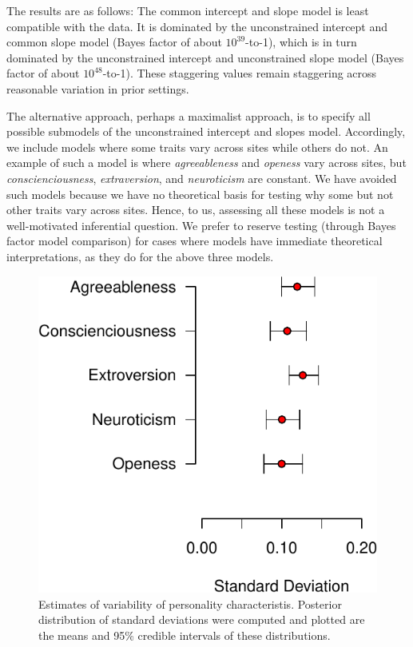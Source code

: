 \documentclass[english,man]{apa6}
\theoremstyle{definition}
\theoremstyle{definition}
\theoremstyle{remark}
\begin{document}
The results are as follows: The common intercept and slope model is
least compatible with the data. It is dominated by the unconstrained
intercept and common slope model (Bayes factor of about
\(10^{39}\)-to-1), which is in turn dominated by the unconstrained
intercept and unconstrained slope model (Bayes factor of about
\(10^{48}\)-to-1). These staggering values remain staggering across
reasonable variation in prior settings.

The alternative approach, perhaps a maximalist approach, is to specify
all possible submodels of the unconstrained intercept and slopes model.
Accordingly, we include models where some traits vary across sites while
others do not. An example of such a model is where \emph{agreeableness}
and \emph{openess} vary across sites, but \emph{conscienciousness},
\emph{extraversion}, and \emph{neuroticism} are constant. We have
avoided such models because we have no theoretical basis for testing why
some but not other traits vary across sites. Hence, to us, assessing all
these models is not a well-motivated inferential question. We prefer to
reserve testing (through Bayes factor model comparison) for cases where
models have immediate theoretical interpretations, as they do for the
above three models.

\begin{figure}[htbp]
\centering
\includegraphics{p_files/figure-latex/corkEst2-1.pdf}
\caption{\label{fig:corkEst2}Estimates of variability of personality
characteristis. Posterior distribution of standard deviations were
computed and plotted are the means and 95\% credible intervals of these
distributions.}
\end{figure}
\end{document}
